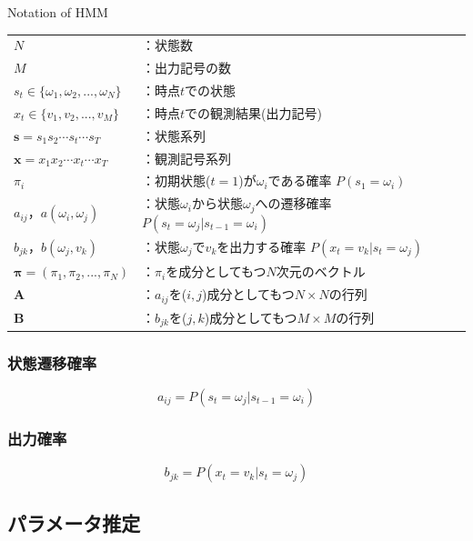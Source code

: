 \begin{myframe}{Notation of HMM}
	\begin{tabular}{ll}
		$N$ & ：状態数 \\
		$M$ & ：出力記号の数 \\
		$s_{t} \in \{\omega_{1}, \omega_{2},..., \omega_{N}\}$ & ：時点$t$での状態 \\
		$x_{t} \in \{v_{1}, v_{2},..., v_{M}\}$ & ：時点$t$での観測結果(出力記号) \\
		$\mathbf{s} = s_{1}s_{2}\cdots s_{t} \cdots s_{T}$ & ：状態系列 \\
		$\mathbf{x} = x_{1}x_{2}\cdots x_{t} \cdots x_{T}$ & ：観測記号系列 \\
		$\pi_{i}$ & ：初期状態($t=1$)が$\omega_{i}$である確率 $P(s_{1} = \omega_{i})$ \\
		$a_{ij}，a(\omega_{i}, \omega_{j})$ & ：状態$\omega_{i}$から状態$\omega_{j}$への遷移確率 $P(s_{t} = \omega_{j} | s_{t-1} = \omega_{i})$ \\
		$b_{jk}，b(\omega_{j}, v_{k})$ & ：状態$\omega_{j}$で$v_{k}$を出力する確率 $P(x_{t} = v_{k} | s_{t} = \omega_{j})$\\
		$\bm{\pi}=(\pi_{1}, \pi_{2}, ..., \pi_{N})$ & ：$\pi_{i}$を成分としてもつ$N$次元のベクトル \\
		$\bm{A}$ & ：$a_{ij}$を($i,j$)成分としてもつ$N \times N$の行列 \\
		$\bm{B}$ & ：$b_{jk}$を($j,k$)成分としてもつ$M \times M$の行列 \\
	\end{tabular}
\end{myframe}

\subsubsection{状態遷移確率}
\begin{equation}
	a_{ij} = P(s_{t} = \omega_{j} | s_{t-1} = \omega_{i})
\end{equation}

\subsubsection{出力確率}
\begin{equation}
	b_{jk} = P(x_{t} = v_{k} | s_{t} = \omega_{j})
\end{equation}

\subsection{パラメータ推定}


